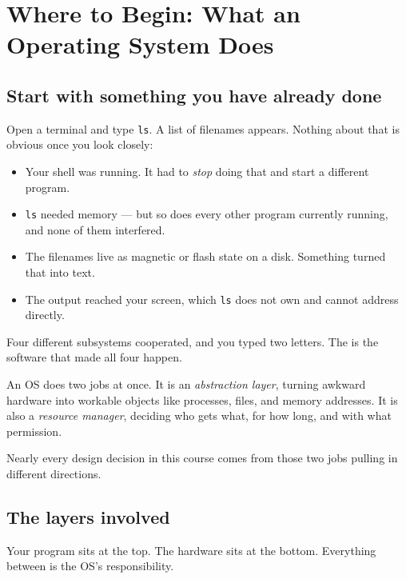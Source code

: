 \chapter*{Where to Begin: What an Operating System Does}\label{ch:overview}

\section*{Start with something you have already done}
Open a terminal and type \texttt{ls}. A list of filenames appears. Nothing about that is obvious once you look closely:

\begin{itemize}
  \item Your shell was running. It had to \emph{stop} doing that and start a different program.
  \item \texttt{ls} needed memory --- but so does every other program currently running, and none of them interfered.
  \item The filenames live as magnetic or flash state on a disk. Something turned that into text.
  \item The output reached your screen, which \texttt{ls} does not own and cannot address directly.
\end{itemize}

Four different subsystems cooperated, and you typed two letters. The  is the software that made all four happen.

\begin{keyidea}
An OS does two jobs at once. It is an \emph{abstraction layer}, turning awkward hardware into workable objects like processes, files, and memory addresses. It is also a \emph{resource manager}, deciding who gets what, for how long, and with what permission.

Nearly every design decision in this course comes from those two jobs pulling in different directions.
\end{keyidea}

\section*{The layers involved}
Your program sits at the top. The hardware sits at the bottom. Everything between is the OS's responsibility.

